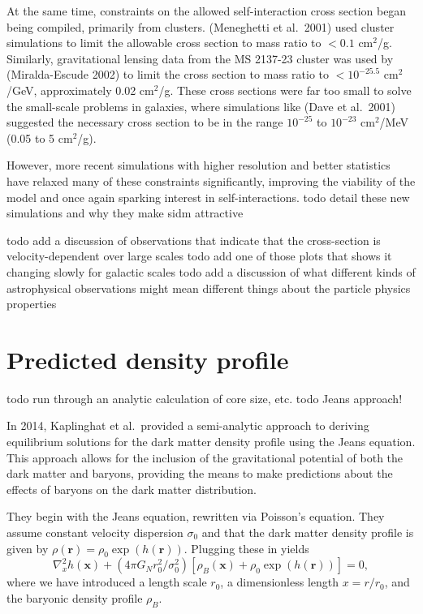 At the same time, constraints on the allowed self-interaction cross
section began being compiled, primarily from clusters. (Meneghetti et
al.~2001) used cluster simulations to limit the allowable cross section
to mass ratio to \(< 0.1\) cm\(^2\)/g. Similarly, gravitational lensing
data from the MS 2137-23 cluster was used by (Miralda-Escude 2002) to
limit the cross section to mass ratio to \(< 10^{-25.5}\) cm\(^2\)/GeV,
approximately 0.02 cm\(^2\)/g. These cross sections were far too small
to solve the small-scale problems in galaxies, where simulations like
(Dave et al.~2001) suggested the necessary cross section to be in the
range \(10^{-25}\) to \(10^{-23}\) cm\(^2\)/MeV (0.05 to 5 cm\(^2\)/g).

However, more recent simulations with higher resolution and better
statistics have relaxed many of these constraints significantly,
improving the viability of the model and once again sparking interest in
self-interactions. todo detail these new simulations and why they make
sidm attractive

todo add a discussion of observations that indicate that the
cross-section is velocity-dependent over large scales todo add one of
those plots that shows it changing slowly for galactic scales todo add a
discussion of what different kinds of astrophysical observations might
mean different things about the particle physics properties

\hypertarget{predicted-density-profile}{%
\section{Predicted density profile}\label{predicted-density-profile}}

todo run through an analytic calculation of core size, etc. todo Jeans
approach!

In 2014, Kaplinghat et al.~provided a semi-analytic approach to deriving
equilibrium solutions for the dark matter density profile using the
Jeans equation. This approach allows for the inclusion of the
gravitational potential of both the dark matter and baryons, providing
the means to make predictions about the effects of baryons on the dark
matter distribution.

They begin with the Jeans equation, rewritten via Poisson's equation.
They assume constant velocity dispersion \(\sigma_0\) and that the dark
matter density profile is given by
\(\rho(\mathbf{r}) = \rho_0 \exp(h(\mathbf{r}))\). Plugging these in
yields
\[ \nabla_x^2 h(\mathbf{x}) + (4\pi G_N r_0^2/\sigma_0^2)[\rho_B(\mathbf{x}) + \rho_0 \exp(h(\mathbf{r}))] = 0, \]
where we have introduced a length scale \(r_0\), a dimensionless length
\(x = r / r_0\), and the baryonic density profile \(\rho_B\).

